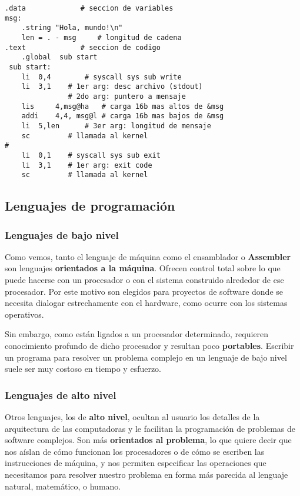 \documentclass[spanish,A4,]{article}
\begin{document}
\begin{verbatim}
.data             # seccion de variables
msg:
    .string "Hola, mundo!\n"
    len = . - msg     # longitud de cadena
.text             # seccion de codigo
    .global  sub start
 sub start:
    li  0,4        # syscall sys sub write
    li  3,1    # 1er arg: desc archivo (stdout)
               # 2do arg: puntero a mensaje
    lis     4,msg@ha   # carga 16b mas altos de &msg
    addi    4,4, msg@l # carga 16b mas bajos de &msg
    li  5,len      # 3er arg: longitud de mensaje
    sc         # llamada al kernel
# 
    li  0,1    # syscall sys sub exit
    li  3,1    # 1er arg: exit code
    sc         # llamada al kernel
\end{verbatim}

\subsection{Lenguajes de
programación}\label{lenguajes-de-programaciuxf3n}

\subsubsection{Lenguajes de bajo nivel}\label{lenguajes-de-bajo-nivel-1}

Como vemos, tanto el lenguaje de máquina como el ensamblador o
\textbf{Assembler} son lenguajes \textbf{orientados a la máquina}.
Ofrecen control total sobre lo que puede hacerse con un procesador o con
el sistema construido alrededor de ese procesador. Por este motivo son
elegidos para proyectos de software donde se necesita dialogar
estrechamente con el hardware, como ocurre con los sistemas operativos.

Sin embargo, como están ligados a un procesador determinado, requieren
conocimiento profundo de dicho procesador y resultan poco
\textbf{portables}. Escribir un programa para resolver un problema
complejo en un lenguaje de bajo nivel suele ser muy costoso en tiempo y
esfuerzo.

\subsubsection{Lenguajes de alto nivel}\label{lenguajes-de-alto-nivel}

Otros lenguajes, los de \textbf{alto nivel}, ocultan al usuario los
detalles de la arquitectura de las computadoras y le facilitan la
programación de problemas de software complejos. Son más
\textbf{orientados al problema}, lo que quiere decir que nos aíslan de
cómo funcionan los procesadores o de cómo se escriben las instrucciones
de máquina, y nos permiten especificar las operaciones que necesitamos
para resolver nuestro problema en forma más parecida al lenguaje
natural, matemático, o humano.
\end{document}
